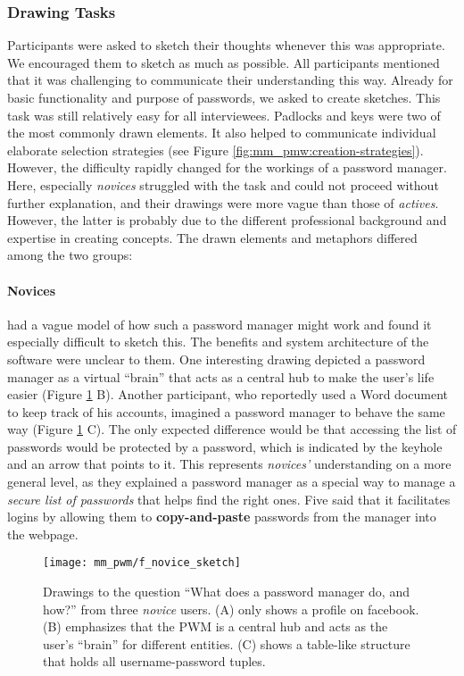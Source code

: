 \subsubsection{Drawing Tasks}
Participants were asked to sketch their thoughts whenever this was appropriate. We encouraged them to sketch as much as possible. All participants mentioned that it was challenging to communicate their understanding this way. Already for basic functionality and purpose of passwords, we asked to create sketches. This task was still relatively easy for all interviewees. Padlocks and keys were two of the most commonly drawn elements. It also helped to communicate individual elaborate selection strategies (see Figure \ref{fig:mm_pmw:creation-strategies}). However, the difficulty rapidly changed for the workings of a password manager.
Here, especially \textit{novices} struggled with the task and could not proceed without further explanation, and their drawings were more vague than those of \textit{actives}. However, the latter is probably due to the different professional background and expertise in creating concepts. The drawn elements and metaphors differed among the two groups: 
\paragraph{Novices} had a vague model of how such a password manager might work and found it especially difficult to sketch this. The benefits and system architecture of the software were unclear to them. One interesting drawing depicted a password manager as a virtual ``brain'' that acts as a central hub to make the user's life easier (Figure \ref{fig:mm_pwm:f_novice_sketch} B). Another participant, who reportedly used a Word document to keep track of his accounts, imagined a password manager to behave the same way (Figure \ref{fig:mm_pwm:f_novice_sketch} C). The only expected difference would be that accessing the list of passwords would be protected by a password, which is indicated by the keyhole and an arrow that points to it. This represents \textit{novices'} understanding on a more general level, as they explained a password manager as a special way to manage a \textit{secure list of passwords} that helps find the right ones. Five said that it facilitates logins by allowing them to \textbf{copy-and-paste} passwords from the manager into the webpage. 
\begin{figure}
	\centering
	\texttt{[image: mm\_pwm/f\_novice\_sketch]}
	\caption{\label{fig:mm_pwm:f_novice_sketch}	Drawings to the question ``What does a password manager do, and how?'' from three \textit{novice} users. (A) only shows a profile on facebook. (B) emphasizes that the PWM is a central hub and acts as the user's ``brain'' for different entities. (C) shows a table-like structure that holds all username-password tuples.}
\end{figure}

